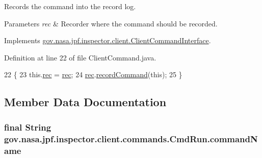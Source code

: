 Records the command into the record log. 


\begin{DoxyParams}{Parameters}
{\em rec} & Recorder where the command should be recorded. \\
\hline
\end{DoxyParams}


Implements \hyperlink{interfacegov_1_1nasa_1_1jpf_1_1inspector_1_1client_1_1_client_command_interface_a4ae9ac9bbb61d9a758ef168e8b3b04ff}{gov.\+nasa.\+jpf.\+inspector.\+client.\+Client\+Command\+Interface}.



Definition at line 22 of file Client\+Command.\+java.


\begin{DoxyCode}
22                                                   \{
23     this.\hyperlink{classgov_1_1nasa_1_1jpf_1_1inspector_1_1client_1_1_client_command_af4246f2427035c72a6af45a2c61361f7}{rec} = \hyperlink{classgov_1_1nasa_1_1jpf_1_1inspector_1_1client_1_1_client_command_af4246f2427035c72a6af45a2c61361f7}{rec};
24     \hyperlink{classgov_1_1nasa_1_1jpf_1_1inspector_1_1client_1_1_client_command_af4246f2427035c72a6af45a2c61361f7}{rec}.\hyperlink{classgov_1_1nasa_1_1jpf_1_1inspector_1_1client_1_1_command_recorder_af5f212124179773e46c8b45f1d01a32d}{recordCommand}(\textcolor{keyword}{this});
25   \}
\end{DoxyCode}


\subsection{Member Data Documentation}
\subsubsection[{\texorpdfstring{command\+Name}{commandName}}]{\setlength{\rightskip}{0pt plus 5cm}final String gov.\+nasa.\+jpf.\+inspector.\+client.\+commands.\+Cmd\+Run.\+command\+Name\hspace{0.3cm}{\ttfamily [private]}}\hypertarget{classgov_1_1nasa_1_1jpf_1_1inspector_1_1client_1_1commands_1_1_cmd_run_aed9e28e35b63746d9870c89ed0a37ac5}{}\label{classgov_1_1nasa_1_1jpf_1_1inspector_1_1client_1_1commands_1_1_cmd_run_aed9e28e35b63746d9870c89ed0a37ac5}


